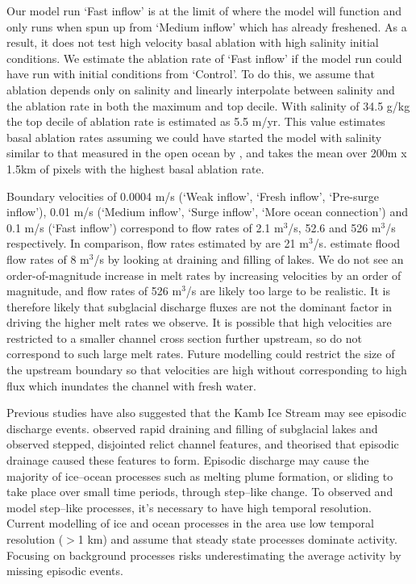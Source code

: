 Our model run `Fast inflow' is at the limit of where the model will function and only runs when spun up from `Medium inflow' which has already freshened. As a result, it does not test high velocity basal ablation with high salinity initial conditions. We estimate the ablation rate of `Fast inflow' if the model run could have run with initial conditions from `Control'. To do this, we assume that ablation depends only on salinity and linearly interpolate between salinity and the ablation rate in both the maximum and top decile. With salinity of 34.5 g/kg the top decile of ablation rate is estimated as 5.5 m/yr. This value estimates basal ablation rates assuming we could have started the model with salinity similar to that measured in the open ocean by \cite{robinson2020ice}, and takes the mean over 200m x 1.5km of pixels with the highest basal ablation rate. 


Boundary velocities of 0.0004  $\mathrm{m}$/s (`Weak inflow', `Fresh inflow', `Pre-surge inflow'), 0.01  $\mathrm{m}$/s (`Medium inflow', `Surge inflow', `More ocean connection') and 0.1 $\mathrm{m}$/s (`Fast inflow') correspond to flow rates of 2.1 $\mathrm{m}^3$/s, 52.6 and 526 $\mathrm{m}^3$/s respectively. In comparison, flow rates estimated by \cite{le2009subglacial} are 21 $\mathrm{m}^3$/s. \cite{kim2016active} estimate flood flow rates of 8 $\mathrm{m}^3$/s by looking at draining and filling of lakes. We do not see an order-of-magnitude increase in melt rates by increasing velocities by an order of magnitude, and flow rates of 526 $\mathrm{m}^3$/s are likely too large to be realistic. It is therefore likely that subglacial discharge fluxes are not the dominant factor in driving the higher melt rates we observe. It is possible that high velocities are restricted to a smaller channel cross section further upstream, so do not correspond to such large melt rates. Future modelling could restrict the size of the upstream boundary so that velocities are high without corresponding to high flux which inundates the channel with fresh water.

Previous studies have also suggested that the Kamb Ice Stream may see episodic discharge events. \cite{kim2016active} observed rapid draining and filling of subglacial lakes and \cite{horgan2017poststagnation} observed stepped, disjointed relict channel features, and theorised that episodic drainage caused these features to form.
Episodic discharge may cause the majority of ice--ocean processes such as melting plume formation, or sliding to take place over small time periods, through step--like change. To observed and model step--like processes, it's necessary to have high temporal resolution. Current modelling of ice and ocean processes in the area \citep[e.g.][]{holland2003ice} use low temporal resolution ($>$1 km) and assume that steady state processes dominate activity. Focusing on background processes risks underestimating the average activity by missing episodic events.

